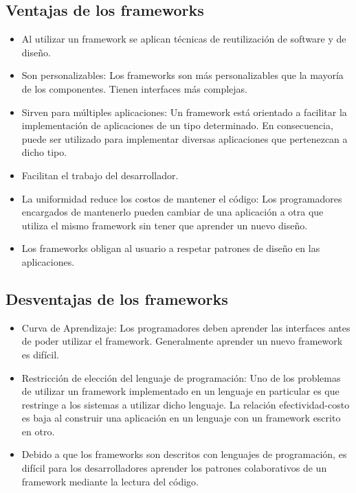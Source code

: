 \subsection {Ventajas de los frameworks}
\begin{itemize}
	\item Al utilizar un framework se aplican técnicas de reutilización de
	software y de diseño.
	
	\item Son personalizables: Los frameworks son más
	personalizables que la mayoría de los componentes. Tienen interfaces más
	complejas.
	
	\item Sirven para múltiples aplicaciones: Un framework está orientado a
	facilitar la implementación de aplicaciones de un tipo determinado. En
	consecuencia, puede ser utilizado para implementar diversas aplicaciones que
	pertenezcan a dicho tipo.
	
	\item Facilitan el trabajo del desarrollador.
	
	\item La uniformidad reduce los costos de mantener el código: Los programadores
	encargados de mantenerlo pueden cambiar de una aplicación a otra que utiliza el
	mismo framework sin tener que aprender un nuevo diseño.
	
	\item Los frameworks obligan al usuario a respetar patrones de diseño en las
	aplicaciones.

\end{itemize}

\subsection {Desventajas de los frameworks}
\begin{itemize}
    \item Curva de Aprendizaje: Los programadores deben aprender las interfaces
    antes de poder utilizar el framework. Generalmente aprender un nuevo
    framework es difícil.
    
    \item Restricción de elección del lenguaje de programación: Uno de los
    problemas de utilizar un framework implementado en un lenguaje en particular
    es que restringe a los sistemas a utilizar dicho lenguaje. La relación
    efectividad-costo es baja al construir una aplicación en un lenguaje con un
    framework escrito en otro.
    
    \item Debido a que los frameworks son descritos con lenguajes de
    programación, es difícil para los desarrolladores aprender los patrones
    colaborativos de un framework mediante la lectura del código.
    
\end{itemize}


